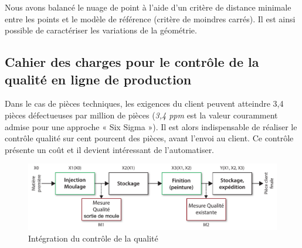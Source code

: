 Nous avons balancé le nuage de point à l'aide d'un critère de distance minimale entre les points et le modèle de référence (critère de moindres carrés).
Il est ainsi possible de caractériser les variations de la géométrie.


\subsection{Cahier des charges pour le contrôle de la qualité en ligne de production}
Dans le cas de pièces techniques, les exigences du client peuvent atteindre 3,4 pièces défectueuses par million de pièces (\textit{3,4 ppm} est la valeur couramment admise pour une approche « Six Sigma »).
Il est alors indispensable de réaliser le contrôle qualité sur cent pourcent des pièces, avant l'envoi au client.
Ce contrôle présente un coût et il devient intéressant de l'automatiser.

\begin{figure}[htbp]
	\centering
	\includegraphics[width=\textwidth]{../Chap2/Figures/integration_controle_qualite.pdf}
	\caption{Intégration du contrôle de la qualité}
	\label{fig:quality_integration}
\end{figure}

